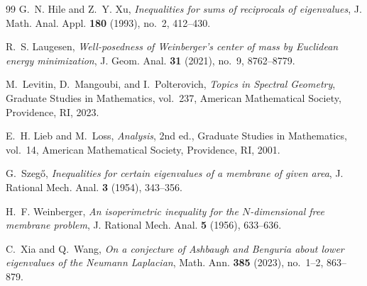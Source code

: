 \documentclass[11pt,letterpaper,reqno]{amsart}
\theoremstyle{definition}
\begin{document}
\begin{thebibliography}{99}
G.~N. Hile and Z.~Y. Xu, \emph{Inequalities for sums of reciprocals of eigenvalues}, J. Math. Anal. Appl. \textbf{180} (1993), no.~2, 412--430.



R.~S. Laugesen,
\emph{Well-posedness of Weinberger's center of mass by Euclidean energy
minimization},
J. Geom. Anal. \textbf{31} (2021), no.~9, 8762--8779.

M.~Levitin, D.~Mangoubi, and I.~Polterovich,
\emph{Topics in Spectral Geometry},
Graduate Studies in Mathematics, vol.~237,
American Mathematical Society, Providence, RI, 2023.


E.~H. Lieb and M.~Loss,
\emph{Analysis},
2nd ed., Graduate Studies in Mathematics, vol.~14,
American Mathematical Society, Providence, RI, 2001.


 G.~Szeg\H{o}, \emph{Inequalities for certain eigenvalues of a membrane of given area}, J. Rational Mech. Anal. \textbf{3} (1954), 343--356.

 H.~F. Weinberger, \emph{An isoperimetric inequality for the $N$-dimensional free membrane problem}, J. Rational Mech. Anal. \textbf{5} (1956), 633--636.

 C.~Xia and Q.~Wang, \emph{On a conjecture of Ashbaugh and Benguria about lower eigenvalues of the Neumann Laplacian}, Math. Ann. \textbf{385} (2023), no.~1--2, 863--879.

\end{thebibliography}
\end{document}
